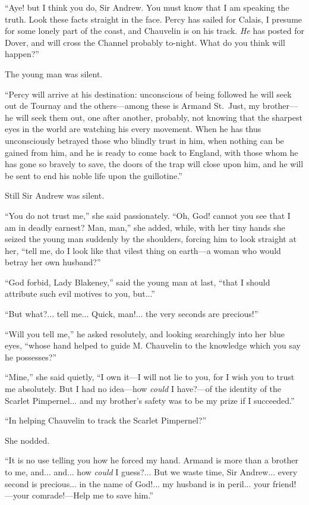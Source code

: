 \documentclass[paper=a5,BCOR=7mm,twoside,DIV=calc,12pt,usegeometry,chapterprefix,endperiod,headings=big]{scrbook}
\begin{document}
\enquote{Aye! but I think you do, Sir Andrew. You must know that I am speaking the truth. Look these facts straight in the face. Percy has sailed for Calais, I presume for some lonely part of the coast, and Chauvelin is on his track. \textit{He} has posted for Dover, and will cross the Channel probably to-night. What do you think will happen?}

The young man was silent.

\enquote{Percy will arrive at his destination: unconscious of being followed he will seek out de Tournay and the others---among these is Armand St.~Just, my brother---he will seek them out, one after another, probably, not knowing that the sharpest eyes in the world are watching his every movement. When he has thus unconsciously betrayed those who blindly trust in him, when nothing can be gained from him, and he is ready to come back to England, with those whom he has gone so bravely to save, the doors of the trap will close upon him, and he will be sent to end his noble life upon the guillotine.}

Still Sir Andrew was silent.

\enquote{You do not trust me,} she said passionately. \enquote{Oh, God! cannot you see that I am in deadly earnest? Man, man,} she added, while, with her tiny hands she seized the young man suddenly by the shoulders, forcing him to look straight at her, \enquote{tell me, do I look like that vilest thing on earth---a woman who would betray her own husband?}

\enquote{God forbid, Lady Blakeney,} said the young man at last, \enquote{that I should attribute such evil motives to you, but...}

\enquote{But what?... tell me... Quick, man!... the very seconds are precious!}

\enquote{Will you tell me,} he asked resolutely, and looking searchingly into her blue eyes, \enquote{whose hand helped to guide M. Chauvelin to the knowledge which you say he possesses?}

\enquote{Mine,} she said quietly, \enquote{I own it---I will not lie to you, for I wish you to trust me absolutely. But I had no idea---how \textit{could} I have?---of the identity of the Scarlet Pimpernel... and my brother's safety was to be my prize if I succeeded.}

\enquote{In helping Chauvelin to track the Scarlet Pimpernel?}

She nodded.

\enquote{It is no use telling you how he forced my hand. Armand is more than a brother to me, and... and... how \textit{could} I guess?... But we waste time, Sir Andrew... every second is precious... in the name of God!... my husband is in peril... your friend!---your comrade!---Help me to save him.}
\end{document}
